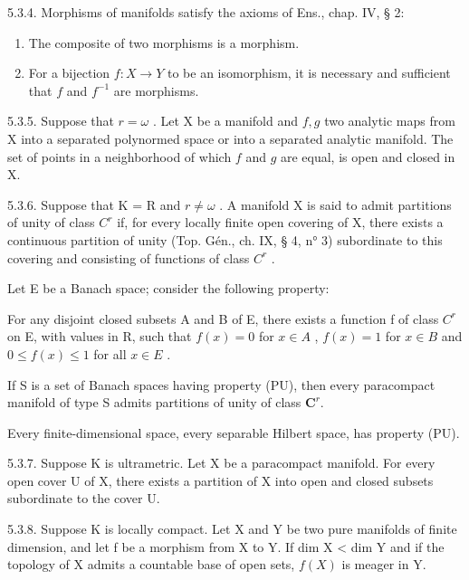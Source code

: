 5.3.4. Morphisms of manifolds satisfy the axioms of Ens., chap. IV, § 2:

\begin{enumerate}
\def\labelenumi{\alph{enumi})}
\item
  The composite of two morphisms is a morphism.
\item
  For a bijection \(f:X\to Y\) to be an isomorphism, it is necessary and sufficient that \(f\) and \(f^{-1}\) are morphisms.
\end{enumerate}

5.3.5. Suppose that \(r = \omega\) . Let X be a manifold and \(f, g\) two analytic maps from X into a separated polynormed space or into a separated analytic manifold. The set of points in a neighborhood of which \(f\) and \(g\) are equal, is open and closed in X.

5.3.6. Suppose that K = R and \(r \neq \omega\) . A manifold X is said to admit partitions of unity of class \(C^{r}\) if, for every locally finite open covering of X, there exists a continuous partition of unity (Top. Gén., ch. IX, § 4, n° 3) subordinate to this covering and consisting of functions of class \(C^{r}\) .

Let E be a Banach space; consider the following property:

For any disjoint closed subsets A and B of E, there exists a function f of class \(C^{r}\) on E, with values in R, such that \(f(x) = 0\) for \(x \in A\) , \(f(x) = 1\) for \(x \in B\) and \(0 \leqslant f(x) \leqslant 1\) for all \(x \in E\) .

If S is a set of Banach spaces having property (PU), then every paracompact manifold of type S admits partitions of unity of class \(\mathbf{C}^{r}\).

Every finite-dimensional space, every separable Hilbert space, has property (PU).

5.3.7. Suppose K is ultrametric. Let X be a paracompact manifold. For every open cover U of X, there exists a partition of X into open and closed subsets subordinate to the cover U.

5.3.8. Suppose K is locally compact. Let X and Y be two pure manifolds of finite dimension, and let f be a morphism from X to Y. If dim X \textless{} dim Y and if the topology of X admits a countable base of open sets, \(f(X)\) is meager in Y.
